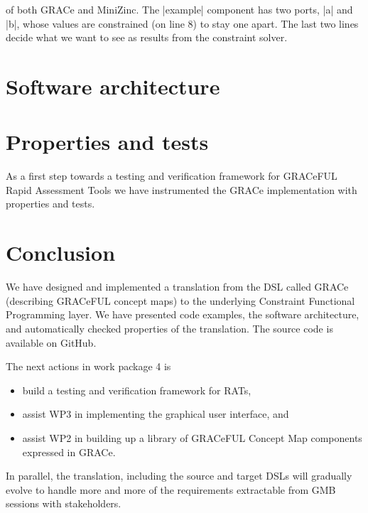 \documentclass{article}
\begin{document}


of both GRACe and
MiniZinc. The |example| component has two ports, |a| and |b|, whose values are
constrained (on line 8) to stay one apart. The last two lines decide what we
want to see as results from the constraint solver.


\section{Software architecture}
\label{sec:architecture}




\section{Properties and tests}

As a first step towards a testing and verification framework for
GRACeFUL Rapid Assessment Tools we have instrumented the GRACe
implementation with properties and tests.
%


\section{Conclusion}
\label{sec:conclusion}

We have designed and implemented a translation from the DSL called
GRACe (describing GRACeFUL concept maps) to the underlying Constraint
Functional Programming layer.
%
We have presented code examples, the software architecture, and
automatically checked properties of the translation.
%
The source code is available on GitHub.

The next actions in work package 4 is
\begin{itemize}
\item build a testing and verification framework for RATs,
\item assist WP3 in implementing the graphical user interface, and
\item assist WP2 in building up a library of GRACeFUL Concept Map
  components expressed in GRACe.
\end{itemize}
%
In parallel, the translation, including the source and target DSLs
will gradually evolve to handle more and more of the requirements
extractable from GMB sessions with stakeholders.

\appendix





\end{document}
